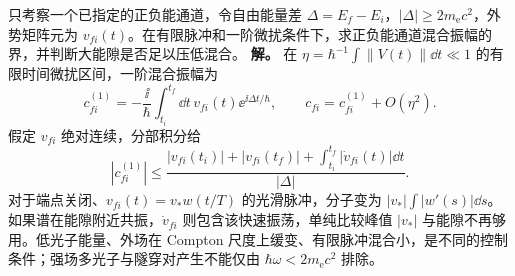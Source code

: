 \begin{exbox}[正负能隙与有限脉冲的混合振幅]
只考察一个已指定的正负能通道，令自由能量差 $\Delta=E_f-E_i$，$|\Delta|\ge2m_{\mathrm e}c^2$，外势矩阵元为 $v_{fi}(t)$。在有限脉冲和一阶微扰条件下，求正负能通道混合振幅的界，并判断大能隙是否足以压低混合。
\textbf{解。} 在 $\eta=\hbar^{-1}\int\|V(t)\|\dd t\ll1$ 的有限时间微扰区间，一阶混合振幅为
\begin{equation*}
 c_{fi}^{(1)}=-\frac{\ii}{\hbar}\int_{t_i}^{t_f}\dd t\,
 v_{fi}(t)\ee^{\ii\Delta t/\hbar},
 \qquad c_{fi}=c_{fi}^{(1)}+O(\eta^2).
\end{equation*}
假定 $v_{fi}$ 绝对连续，分部积分给
\begin{equation*}
 |c_{fi}^{(1)}|\le
 \frac{|v_{fi}(t_i)|+|v_{fi}(t_f)|
 +\int_{t_i}^{t_f}|\dot v_{fi}(t)|\dd t}{|\Delta|}.
\end{equation*}
对于端点关闭、$v_{fi}(t)=v_*w(t/T)$ 的光滑脉冲，分子变为 $|v_*|\int|w'(s)|\dd s$。如果谱在能隙附近共振，$\dot v_{fi}$ 则包含该快速振荡，单纯比较峰值 $|v_*|$ 与能隙不再够用。低光子能量、外场在 Compton 尺度上缓变、有限脉冲混合小，是不同的控制条件；强场多光子与隧穿对产生不能仅由 $\hbar\omega<2m_{\mathrm e}c^2$ 排除。
\end{exbox}
